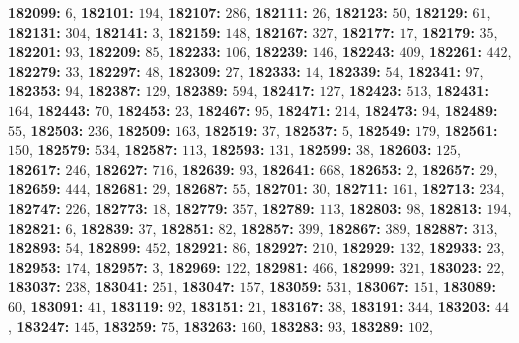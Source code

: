\textsf{\bfseries 182099:} $6$, \textsf{\bfseries 182101:} $194$, \textsf{\bfseries 182107:} $286$, \textsf{\bfseries 182111:} $26$, \textsf{\bfseries 182123:} $50$, \textsf{\bfseries 182129:} $61$, \textsf{\bfseries 182131:} $304$, \textsf{\bfseries 182141:} $3$, \textsf{\bfseries 182159:} $148$, \textsf{\bfseries 182167:} $327$, \textsf{\bfseries 182177:} $17$, \textsf{\bfseries 182179:} $35$, \textsf{\bfseries 182201:} $93$, \textsf{\bfseries 182209:} $85$, \textsf{\bfseries 182233:} $106$, \textsf{\bfseries 182239:} $146$, \textsf{\bfseries 182243:} $409$, \textsf{\bfseries 182261:} $442$, \textsf{\bfseries 182279:} $33$, \textsf{\bfseries 182297:} $48$, \textsf{\bfseries 182309:} $27$, \textsf{\bfseries 182333:} $14$, \textsf{\bfseries 182339:} $54$, \textsf{\bfseries 182341:} $97$, \textsf{\bfseries 182353:} $94$, \textsf{\bfseries 182387:} $129$, \textsf{\bfseries 182389:} $594$, \textsf{\bfseries 182417:} $127$, \textsf{\bfseries 182423:} $513$, \textsf{\bfseries 182431:} $164$, \textsf{\bfseries 182443:} $70$, \textsf{\bfseries 182453:} $23$, \textsf{\bfseries 182467:} $95$, \textsf{\bfseries 182471:} $214$, \textsf{\bfseries 182473:} $94$, \textsf{\bfseries 182489:} $55$, \textsf{\bfseries 182503:} $236$, \textsf{\bfseries 182509:} $163$, \textsf{\bfseries 182519:} $37$, \textsf{\bfseries 182537:} $5$, \textsf{\bfseries 182549:} $179$, \textsf{\bfseries 182561:} $150$, \textsf{\bfseries 182579:} $534$, \textsf{\bfseries 182587:} $113$, \textsf{\bfseries 182593:} $131$, \textsf{\bfseries 182599:} $38$, \textsf{\bfseries 182603:} $125$, \textsf{\bfseries 182617:} $246$, \textsf{\bfseries 182627:} $716$, \textsf{\bfseries 182639:} $93$, \textsf{\bfseries 182641:} $668$, \textsf{\bfseries 182653:} $2$, \textsf{\bfseries 182657:} $29$, \textsf{\bfseries 182659:} $444$, \textsf{\bfseries 182681:} $29$, \textsf{\bfseries 182687:} $55$, \textsf{\bfseries 182701:} $30$, \textsf{\bfseries 182711:} $161$, \textsf{\bfseries 182713:} $234$, \textsf{\bfseries 182747:} $226$, \textsf{\bfseries 182773:} $18$, \textsf{\bfseries 182779:} $357$, \textsf{\bfseries 182789:} $113$, \textsf{\bfseries 182803:} $98$, \textsf{\bfseries 182813:} $194$, \textsf{\bfseries 182821:} $6$, \textsf{\bfseries 182839:} $37$, \textsf{\bfseries 182851:} $82$, \textsf{\bfseries 182857:} $399$, \textsf{\bfseries 182867:} $389$, \textsf{\bfseries 182887:} $313$, \textsf{\bfseries 182893:} $54$, \textsf{\bfseries 182899:} $452$, \textsf{\bfseries 182921:} $86$, \textsf{\bfseries 182927:} $210$, \textsf{\bfseries 182929:} $132$, \textsf{\bfseries 182933:} $23$, \textsf{\bfseries 182953:} $174$, \textsf{\bfseries 182957:} $3$, \textsf{\bfseries 182969:} $122$, \textsf{\bfseries 182981:} $466$, \textsf{\bfseries 182999:} $321$, \textsf{\bfseries 183023:} $22$, \textsf{\bfseries 183037:} $238$, \textsf{\bfseries 183041:} $251$, \textsf{\bfseries 183047:} $157$, \textsf{\bfseries 183059:} $531$, \textsf{\bfseries 183067:} $151$, \textsf{\bfseries 183089:} $60$, \textsf{\bfseries 183091:} $41$, \textsf{\bfseries 183119:} $92$, \textsf{\bfseries 183151:} $21$, \textsf{\bfseries 183167:} $38$, \textsf{\bfseries 183191:} $344$, \textsf{\bfseries 183203:} $44$, \textsf{\bfseries 183247:} $145$, \textsf{\bfseries 183259:} $75$, \textsf{\bfseries 183263:} $160$, \textsf{\bfseries 183283:} $93$, \textsf{\bfseries 183289:} $102$, 
